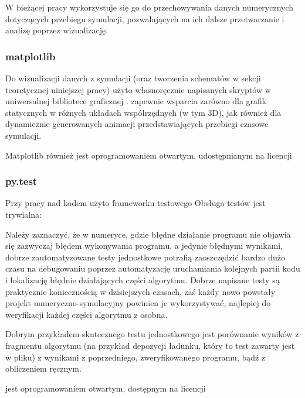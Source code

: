 {    W bieżącej pracy wykorzystuje się go do przechowywania danych numerycznych dotyczących
    przebiegu symulacji, pozwalających na ich dalsze przetwarzanie i analizę poprzez
    wizualizację.

    \subsubsection{matplotlib}
    Do wizualizacji danych z symulacji
    (oraz tworzenia schematów w sekcji teoretycznej niniejszej pracy)
    użyto własnoręcznie napisanych skryptów w uniwersalnej bibliotece graficznej
    .  zapewnie wsparcia zarówno
    dla grafik statycznych w różnych układach współrzędnych (w tym 3D), jak również dla
    dynamicznie generowanych animacji przedstawiających przebiegi czasowe symulacji.

    Matplotlib również jest oprogramowaniem otwartym, udostępnianym na licencji

    \subsubsection{py.test}
    Przy pracy nad kodem użyto frameworku testowego  
    Obsługa testów jest trywialna:


    Należy zaznaczyć, że w numeryce, gdzie błędne działanie programu nie objawia się
    zazwyczaj błędem wykonywania programu, a jedynie błędnymi wynikami, dobrze zautomatyzowane
    testy jednostkowe potrafią zaoszczędzić bardzo dużo czasu na debugowaniu
    poprzez automatyzację uruchamiania kolejnych partii kodu i lokalizację błędnie działających
    części algorytmu. Dobrze napisane testy są praktycznie koniecznością w dzisiejszych
    czasach, zaś każdy nowo powstały projekt numeryczno-symulacyjny powinien je
    wykorzystywać, najlepiej do weryfikacji każdej części algorytmu z osobna.

    Dobrym przykładem skutecznego testu jednostkowego jest porównanie wyników z fragmentu
    algorytmu (na przykład depozycji ładunku, który to test zawarty jest w pliku)
     
    z wynikami z poprzedniego, zweryfikowanego programu, bądź z obliczeniem ręcznym.

     jest oprogramowaniem otwartym, dostępnym na licencji 

}
